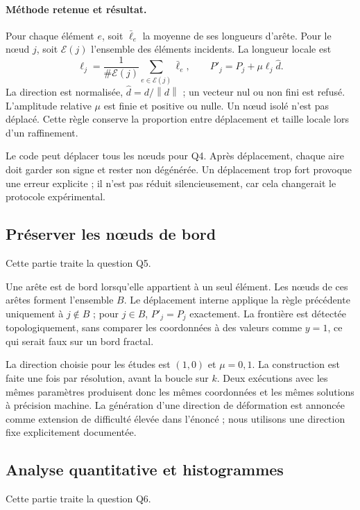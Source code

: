\documentclass[12pt,a4paper]{article}
\newcommand{\norm}[1]{\left\lVert#1\right\rVert}
\begin{document}
\paragraph{Méthode retenue et résultat.}
Pour chaque élément $e$, soit $\bar\ell_e$ la moyenne de ses longueurs d'arête. Pour le nœud $j$, soit $\mathcal E(j)$ l'ensemble des éléments incidents. La longueur locale est
\begin{equation*}
\ell_j=\frac{1}{\#\mathcal E(j)}\sum_{e\in\mathcal E(j)}\bar\ell_e,
\qquad P'_j=P_j+\mu\ell_j\widehat d.
\end{equation*}
La direction est normalisée, $\widehat d=d/\norm{d}$ ; un vecteur nul ou non fini est refusé. L'amplitude relative $\mu$ est finie et positive ou nulle. Un nœud isolé n'est pas déplacé. Cette règle conserve la proportion entre déplacement et taille locale lors d'un raffinement.

Le code peut déplacer tous les nœuds pour Q4. Après déplacement, chaque aire doit garder son signe et rester non dégénérée. Un déplacement trop fort provoque une erreur explicite ; il n'est pas réduit silencieusement, car cela changerait le protocole expérimental.

\subsection{Préserver les nœuds de bord}
Cette partie traite la question Q5.

Une arête est de bord lorsqu'elle appartient à un seul élément. Les nœuds de ces arêtes forment l'ensemble $B$. Le déplacement interne applique la règle précédente uniquement à $j\notin B$ ; pour $j\in B$, $P'_j=P_j$ exactement. La frontière est détectée topologiquement, sans comparer les coordonnées à des valeurs comme $y=1$, ce qui serait faux sur un bord fractal.

La direction choisie pour les études est $(1,0)$ et $\mu=0,1$. La construction est faite une fois par résolution, avant la boucle sur $k$. Deux exécutions avec les mêmes paramètres produisent donc les mêmes coordonnées et les mêmes solutions à précision machine. La génération d'une direction de déformation est annoncée comme extension de difficulté élevée dans l'énoncé ; nous utilisons une direction fixe explicitement documentée.

\subsection{Analyse quantitative et histogrammes}
Cette partie traite la question Q6.
\end{document}
